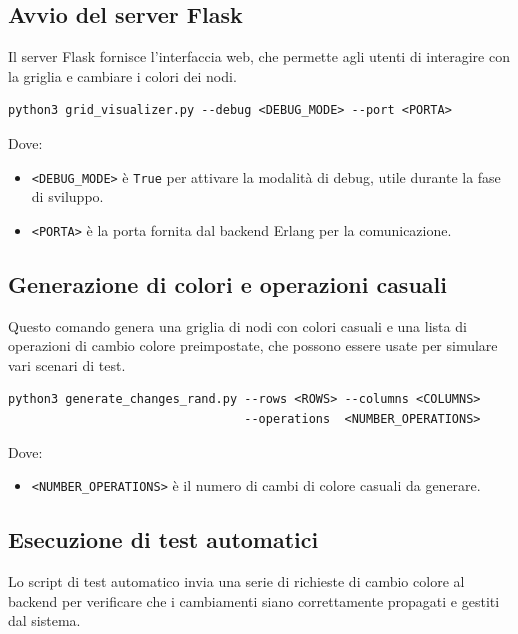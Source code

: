 \documentclass[12pt, a4paper]{report}
\begin{document}
\subsection{Avvio del server Flask}
Il server Flask fornisce l’interfaccia web, che permette agli utenti di interagire con la griglia e cambiare i colori dei nodi.

\begin{tcolorbox}[title=Comandi di avvio del server Flask]
\begin{verbatim}
python3 grid_visualizer.py --debug <DEBUG_MODE> --port <PORTA>
\end{verbatim}
\end{tcolorbox}

\noindent Dove:
\begin{itemize}
    \item \texttt{<DEBUG\_MODE>} \`e \texttt{True} per attivare la modalità di debug, utile durante la fase di sviluppo.
    \item \texttt{<PORTA>} \`e la porta fornita dal backend Erlang per la comunicazione.
\end{itemize}

\subsection{Generazione di colori e operazioni casuali}
Questo comando genera una griglia di nodi con colori casuali e una lista di operazioni di cambio colore preimpostate, che possono essere usate per simulare vari scenari di test.

\begin{tcolorbox}[title=Generazione di colori e operazioni casuali]
\begin{verbatim}
python3 generate_changes_rand.py --rows <ROWS> --columns <COLUMNS> 
                                 --operations  <NUMBER_OPERATIONS>
\end{verbatim}
\end{tcolorbox}

\noindent Dove:
\begin{itemize}
    \item \texttt{<NUMBER\_OPERATIONS>} \`e il numero di cambi di colore casuali da generare.
\end{itemize}

\subsection{Esecuzione di test automatici}
Lo script di test automatico invia una serie di richieste di cambio colore al backend per verificare che i cambiamenti siano correttamente propagati e gestiti dal sistema.
\end{document}
